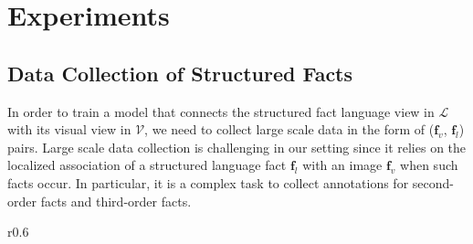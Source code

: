 \documentclass[runningheads]{llncs}
\begin{document}
\section{Experiments}
\label{sec_exp}
\vspace{-2mm}\subsection{Data Collection of Structured Facts}\vspace{-2mm}\label{sec_data}
In order to train a 
model that connects the structured fact language view in $\mathcal{L}$ with its visual view in $\mathcal{V}$,  we need to collect large scale data in the form of ($\mathbf{f}_v$, $\mathbf{f}_l$) pairs. Large scale data collection is  challenging in our setting since it  relies on the localized association of a structured language fact $\mathbf{f}_l$ with an image $\mathbf{f}_v$ when such facts occur. In particular, it is a complex task to collect annotations for second-order facts and third-order facts.  %
\begin{wraptable}{r}{0.6\textwidth} \vspace{-9mm} 
  \centering
  \caption{Coverage of facts in the Large Scale Setting}
  \vspace{-3mm} 
    \label{tab_lsc_setting}%
    \vspace{-3mm} 
\end{wraptable}
\end{document}

